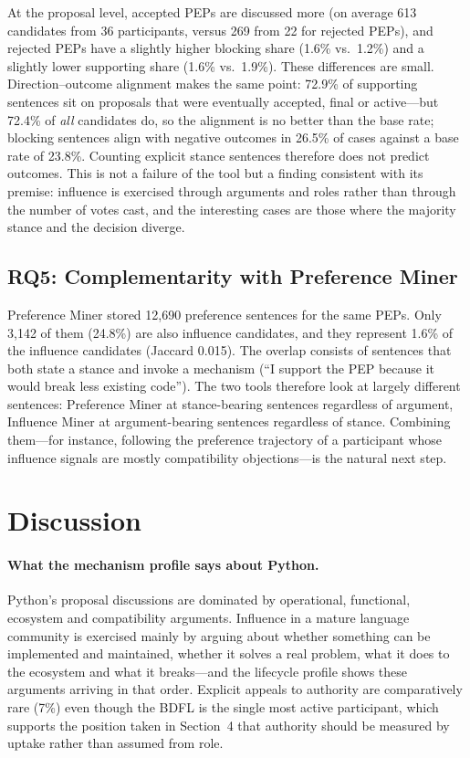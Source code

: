 \documentclass[sigconf,screen]{acmart}
\begin{document}
At the proposal level, accepted PEPs are discussed more (on average 613 candidates from 36 participants, versus 269 from 22 for rejected PEPs), and rejected PEPs have a slightly higher blocking share (1.6\% vs.\ 1.2\%) and a slightly lower supporting share (1.6\% vs.\ 1.9\%). These differences are small. Direction--outcome alignment makes the same point: 72.9\% of supporting sentences sit on proposals that were eventually accepted, final or active---but 72.4\% of \emph{all} candidates do, so the alignment is no better than the base rate; blocking sentences align with negative outcomes in 26.5\% of cases against a base rate of 23.8\%. Counting explicit stance sentences therefore does not predict outcomes. This is not a failure of the tool but a finding consistent with its premise: influence is exercised through arguments and roles rather than through the number of votes cast, and the interesting cases are those where the majority stance and the decision diverge.

\subsection{RQ5: Complementarity with Preference Miner}

Preference Miner stored 12,690 preference sentences for the same PEPs. Only 3,142 of them (24.8\%) are also influence candidates, and they represent 1.6\% of the influence candidates (Jaccard 0.015). The overlap consists of sentences that both state a stance and invoke a mechanism (``I support the PEP because it would break less existing code''). The two tools therefore look at largely different sentences: Preference Miner at stance-bearing sentences regardless of argument, Influence Miner at argument-bearing sentences regardless of stance. Combining them---for instance, following the preference trajectory of a participant whose influence signals are mostly compatibility objections---is the natural next step.

\section{Discussion}

\paragraph{What the mechanism profile says about Python.} Python's proposal discussions are dominated by operational, functional, ecosystem and compatibility arguments. Influence in a mature language community is exercised mainly by arguing about whether something can be implemented and maintained, whether it solves a real problem, what it does to the ecosystem and what it breaks---and the lifecycle profile shows these arguments arriving in that order. Explicit appeals to authority are comparatively rare (7\%) even though the BDFL is the single most active participant, which supports the position taken in Section~4 that authority should be measured by uptake rather than assumed from role.
\end{document}
